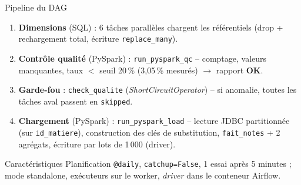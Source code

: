 \documentclass[10pt]{beamer}
\begin{document}
\begin{frame}{Pipeline du DAG}
  \scriptsize
  \begin{enumerate}
    \item \textbf{Dimensions} (SQL) : 6 tâches parallèles chargent les référentiels
          (drop + rechargement total, écriture \texttt{replace\_many}).
    \item \textbf{Contrôle qualité} (PySpark) : \texttt{run\_pyspark\_qc} -- comptage,
          valeurs manquantes, taux $<$ seuil 20\,\% (3{,}05\,\% mesurés) $\rightarrow$
          rapport \textbf{OK}.
    \item \textbf{Garde-fou} : \texttt{check\_qualite} (\emph{ShortCircuitOperator}) --
          si anomalie, toutes les tâches aval passent en \texttt{skipped}.
    \item \textbf{Chargement} (PySpark) : \texttt{run\_pyspark\_load} --
          lecture JDBC partitionnée (sur \texttt{id\_matiere}), construction des clés de
          substitution, \texttt{fait\_notes} + 2 agrégats, écriture par lots de
          1\,000 (driver).
  \end{enumerate}
  \vspace{0.4em}
  \begin{block}{Caractéristiques}
    Planification \texttt{@daily}, \texttt{catchup=False}, 1 essai après 5 minutes ;
    mode standalone, exécuteurs sur le worker, \emph{driver} dans le conteneur Airflow.
  \end{block}
\end{frame}
\end{document}
